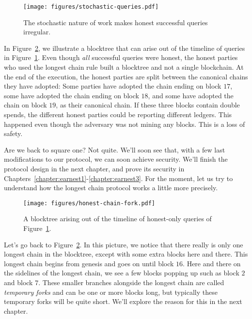 \begin{figure}[h]
    \centering
    \texttt{[image: figures/stochastic-queries.pdf]}
    \caption{The stochastic nature of work makes honest successful queries irregular.}
    \label{fig.stochastic-queries}
\end{figure}

In Figure~\ref{fig.honest-chain-fork}, we illustrate a
blocktree that can arise out of the timeline of queries in Figure~\ref{fig.stochastic-queries}.
Even though \emph{all} successful queries were honest, the honest parties who used the longest
chain rule built a blocktree and not a single blockchain. At the end of the execution, the honest
parties are split between the canonical chains they have adopted: Some parties have adopted
the chain ending on block $17$, some have adopted the chain ending on block $18$, and some have
adopted the chain on block $19$, as their canonical chain. If these three blocks contain double
spends, the different honest parties could be reporting different ledgers. This happened even
though the adversary was not mining any blocks. This is a loss of safety.

Are we back to square one? Not quite. We'll soon see that, with a few last modifications to
our protocol, we can soon achieve security. We'll finish the protocol design in the next chapter,
and prove its security in Chapters~\ref{chapter:earnest1}-\ref{chapter:earnest3}. For the moment,
let us try to understand how the longest chain protocol works a little more precisely.

\begin{figure}[h]
    \centering
    \texttt{[image: figures/honest-chain-fork.pdf]}
    \caption{A blocktree arising out of the timeline of honest-only queries of Figure~\ref{fig.stochastic-queries}.}
    \label{fig.honest-chain-fork}
\end{figure}

Let's go back to Figure~\ref{fig.honest-chain-fork}. In this picture, we notice that there
really is only one longest chain in the blocktree, except with some extra blocks here and
there. This longest chain begins from genesis and goes on until block $16$. Here and there
on the sidelines of the longest chain, we see a few blocks popping up such as block $2$
and block $7$. These smaller branches alongside the longest chain are called \emph{temporary
forks} and can be one or more blocks long, but typically these
temporary forks will be quite short. We'll explore the reason for this in the next chapter.

